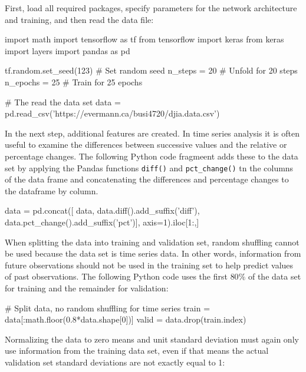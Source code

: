 First, load all required packages, specify parameters for the network architecture and training, and then read the data file:

\begin{samepage}
\begin{pythoncode}
import math
import tensorflow as tf
from tensorflow import keras
from keras import layers
import pandas as pd

tf.random.set_seed(123)   # Set random seed
n_steps = 20              # Unfold for 20 steps
n_epochs = 25             # Train for 25 epochs

# The read the data set
data = pd.read_csv('https://evermann.ca/busi4720/djia.data.csv')
\end{pythoncode}
\end{samepage}

In the next step, additional features are created. In time series analysis it is often useful to examine the differences between successive values and the relative or percentage changes. The following Python code fragmeent adds these to the data set by applying the Pandas functions \texttt{diff()} and \texttt{pct\_change()} tn the columns of the data frame and concatenating the differences and percentage changes to the dataframe by column.

\begin{samepage}
\begin{pythoncode}
data = pd.concat([
    data,
    data.diff().add_suffix('diff'),
    data.pct_change().add_suffix('pct')],
    axis=1).iloc[1:,]
\end{pythoncode}
\end{samepage}

When splitting the data into training and validation set, random shuffling cannot be used because the data set is time series data. In other words, information from future observations should not be used in the training set to help predict values of past observations. The following Python code uses the first $80\%$ of the data set for training and the remainder for validation:

\begin{samepage}
\begin{pythoncode}    
# Split data, no random shuffling for time series
train = data[:math.floor(0.8*data.shape[0])]
valid = data.drop(train.index)
\end{pythoncode}
\end{samepage}

Normalizing the data to zero means and unit standard deviation must again only use information from the training data set, even if that means the actual validation set standard deviations are not exactly equal to 1:


